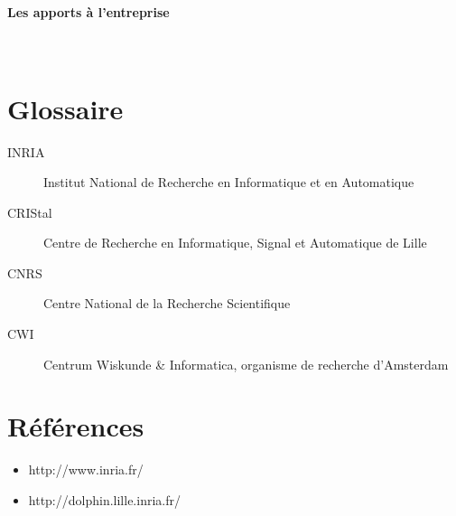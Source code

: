 \documentclass[a4paper,10pt]{report}
\begin{document}
      \paragraph{Les apports à l'entreprise}
	   ~\\
	   
    \newpage

    \newpage
    
    \section*{Glossaire}
    
      \begin{description}
	\item [INRIA] Institut National de Recherche en Informatique et en Automatique
	\item [CRIStal] Centre de Recherche en Informatique, Signal et Automatique de Lille
	\item [CNRS] Centre National de la Recherche Scientifique
	\item [CWI] Centrum Wiskunde & Informatica, organisme de recherche d'Amsterdam
      \end{description}

    \newpage

    \newpage
   
    \section*{Références}
      \begin{itemize}
       \item http://www.inria.fr/
       \item http://dolphin.lille.inria.fr/
      \end{itemize}

    \newpage

  
\end{document}

